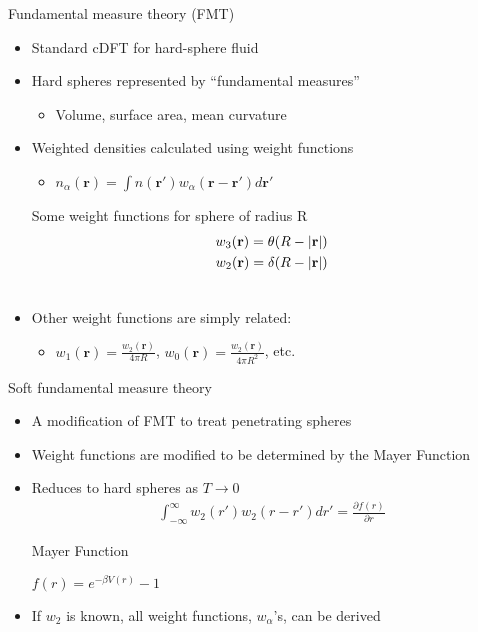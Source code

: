 \documentclass{beamer}
\newcommand{\rr}{\textbf{r}}
\begin{document}
\begin{frame}{Fundamental measure theory (FMT)}
  \begin{itemize}
    \item Standard cDFT for hard-sphere
      fluid
    \item Hard spheres represented by ``fundamental measures''
      \begin{itemize}
        \item Volume, surface area, mean curvature
      \end{itemize}
    \item Weighted densities calculated using weight functions
      \begin{itemize}
        \item $n_{\alpha}(\rr) = \int n(\rr')w_{\alpha}(\rr -
        \rr')d\rr'$
      \end{itemize}
      \begin{block}{Some weight functions for sphere of radius R}
        \begin{align}
          w_3(\rr) = \theta (R - |\rr|) \\
          w_2(\rr) = \delta (R - |\rr|) \\
          \notag
        \end{align}
      \end{block}
    \item Other weight functions are simply related:
      \begin{itemize}
        \item $w_1(\rr) = \frac{w_2(\rr)}{4\pi R}$, $w_0(\rr) =
          \frac{w_2(\rr)}{4\pi R^2}$,  etc.
      \end{itemize}
  \end{itemize}
\end{frame}

\begin{frame}{Soft fundamental measure theory}
  \begin{itemize}
    \item A modification of FMT to treat penetrating spheres
    \item Weight functions are modified to be determined by the Mayer
      Function
    \item Reduces to hard spheres as $T \to 0$
      \begin{align}
        \int_{-\infty}^{\infty}w_2(r')w_2(r - r') dr' = \frac{\partial f(r)}{\partial r}
      \end{align}
      \begin{block}{Mayer Function}
        \begin{center}
          $f(r) = e^{-\beta V(r)} - 1$ \\
        \end{center}
      \end{block}
    \item If $w_2$ is known, all weight functions, $w_{\alpha}$'s, can
      be derived
  \end{itemize}
\end{frame}
\end{document}
